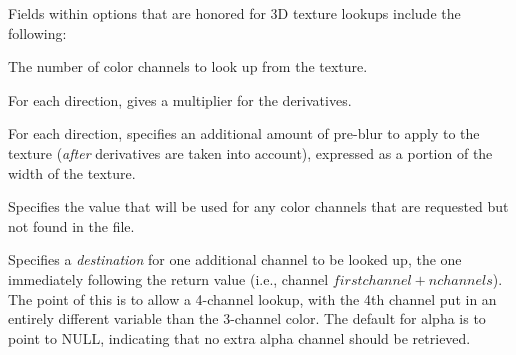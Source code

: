 Fields within {\cf options} that are honored for 3D texture lookups
include the following:

\vspace{-12pt}
\vspace{10pt}
The number of color channels to look up from the texture.
\apiend

\vspace{-24pt}
\vspace{10pt}
For each direction, gives a multiplier for the derivatives.
\apiend

\vspace{-24pt}
\vspace{10pt}
For each direction, specifies an additional amount of pre-blur to apply
to the texture (\emph{after} derivatives are taken into account),
expressed as a portion of the width of the texture.
\apiend

\vspace{-24pt}
\vspace{10pt}
Specifies the value that will be used for any color channels that are
requested but not found in the file.
\apiend

\vspace{-24pt}
\vspace{10pt}
Specifies a \emph{destination} for one additional channel to be looked
up, the one immediately following the return value (i.e., channel
$\mathit{firstchannel}+\mathit{nchannels}$).  The point of this is to
allow a 4-channel lookup, with the 4th channel put in an entirely
different variable than the 3-channel color.  The default for {\cf
  alpha} is to point to NULL, indicating that no extra alpha channel
should be retrieved.
\apiend

\apiend


